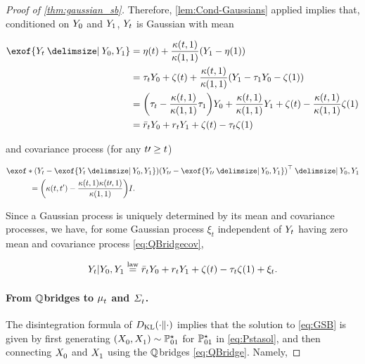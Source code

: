 \begin{proof}[Proof of \cref{thm:gaussian_sb}]
Therefore, \cref{lem:Cond-Gaussians} applied implies that, conditioned on $\refsde[0]$ and $\refsde[\horizon]$, $\refsde$ is Gaussian with mean

\begin{align}
\nn
\exof{  \refsde \given \refsde[0], \refsde[\horizon] } &= \mYcinit + \frac{\kernel[\ctime][\horizon]}{ \kernel[\horizon][\horizon] }\parens*{ \refsde[\horizon] - \mYcinit[\horizon] } \\
\nn
&= \aggtime \refsde[0] + \tshift + \frac{\kernel[\ctime][\horizon]}{ \kernel[\horizon][\horizon] }\parens*{ \refsde[\horizon] - \aggtime[\horizon]\refsde[0] - \tshift[\horizon] } \\
\nn
&= \parens*{  \aggtime -  \frac{\kernel[\ctime][\horizon]}{ \kernel[\horizon][\horizon] } \aggtime[\horizon] } \refsde[0] +  \frac{\kernel[\ctime][\horizon]}{ \kernel[\horizon][\horizon] } \refsde[\horizon] + \tshift -  \frac{\kernel[\ctime][\horizon]}{ \kernel[\horizon][\horizon] } \tshift[\horizon]  \\
\label{eq:QBridgem}
&= \ratioc \refsde[0] + \ratio \refsde[\horizon] + \tshift - \aggtime \tshift[\horizon]
\end{align}

and covariance process (for any $\ctime\prime \geq \ctime$)

\begin{align}
\label{eq:QBridgecov}
&\exof*{ \parens*{ \refsde - \exof{  \refsde \given \refsde[0], \refsde[\horizon] } }\parens*{ \refsde[\ctime\prime] - \exof{  \refsde[\ctime\prime] \given \refsde[0], \refsde[\horizon] } }^\top \given \refsde[0], \refsde[\horizon]  } \\
\nn 
&\quad\quad\quad= \parens*{   \kernel - \frac{\kernel[\ctime][\horizon] \kernel[\ctime\prime][\horizon]}{ \kernel[\horizon][\horizon]} } \eye.
\end{align}

Since a Gaussian process is uniquely determined by its mean and covariance processes, we have, for some Gaussian process $\xi_t$ independent of $\refsde$ having zero mean and covariance process \eqref{eq:QBridgecov},

\begin{equation}
\label{eq:QBridge}
\refsde \vert \refsde[0], \refsde[\horizon] \eqlaw \ratioc \refsde[0] + \ratio \refsde[\horizon] + \tshift - \aggtime \tshift[\horizon] + \xi_t.
\end{equation}


\paragraph{From $\refprobase$\textendash bridges to $\meansol$ and $\Sigmasol$.}
The disintegration formula of $\KL(\cdot \| \cdot)$ \citep{leonard2013survey} implies that the solution to \eqref{eq:GSB} is given by first generating $(\Xsol[0], \Xsol[\horizon]) \sim \Pstasol$ for $\Pstasol$ in \eqref{eq:Pstasol}, and then connecting $\Xsol[0]$ and $\Xsol[\horizon]$ using the $\refprobase$\textendash bridges \eqref{eq:QBridge}. Namely,


\end{proof}
